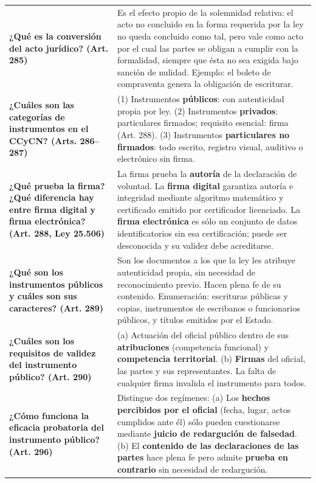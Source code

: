 \documentclass[12pt,oneside]{book}
\begin{document}
\begin{table}[H]
\begin{tabularx}{\textwidth}{
    >{\raggedright\arraybackslash}p{}
    >{\raggedright\arraybackslash}X
}
\textbf{¿Qué es la conversión del acto jurídico? (Art. 285)} &
Es el efecto propio de la solemnidad relativa: el acto no concluido en la forma requerida por la ley no queda concluido como tal, pero vale como acto por el cual las partes se obligan a cumplir con la formalidad, siempre que ésta no sea exigida bajo sanción de nulidad. Ejemplo: el boleto de compraventa genera la obligación de escriturar. \\[6pt]

\textbf{¿Cuáles son las categorías de instrumentos en el CCyCN? (Arts. 286--287)} &
(1) Instrumentos \textbf{públicos}: con autenticidad propia por ley. (2) Instrumentos \textbf{privados}: particulares firmados; requisito esencial: firma (Art. 288). (3) Instrumentos \textbf{particulares no firmados}: todo escrito, registro visual, auditivo o electrónico sin firma. \\[6pt]

\textbf{¿Qué prueba la firma? ¿Qué diferencia hay entre firma digital y firma electrónica? (Art. 288, Ley 25.506)} &
La firma prueba la \textbf{autoría} de la declaración de voluntad. La \textbf{firma digital} garantiza autoría e integridad mediante algoritmo matemático y certificado emitido por certificador licenciado. La \textbf{firma electrónica} es sólo un conjunto de datos identificatorios sin esa certificación; puede ser desconocida y su validez debe acreditarse. \\[6pt]

\textbf{¿Qué son los instrumentos públicos y cuáles son sus caracteres? (Art. 289)} &
Son los documentos a los que la ley les atribuye autenticidad propia, sin necesidad de reconocimiento previo. Hacen plena fe de su contenido. Enumeración: escrituras públicas y copias, instrumentos de escribanos o funcionarios públicos, y títulos emitidos por el Estado. \\[6pt]

\textbf{¿Cuáles son los requisitos de validez del instrumento público? (Art. 290)} &
(a) Actuación del oficial público dentro de sus \textbf{atribuciones} (competencia funcional) y \textbf{competencia territorial}. (b) \textbf{Firmas} del oficial, las partes y sus representantes. La falta de cualquier firma invalida el instrumento para todos. \\[6pt]

\textbf{¿Cómo funciona la eficacia probatoria del instrumento público? (Art. 296)} &
Distingue dos regímenes: (a) Los \textbf{hechos percibidos por el oficial} (fecha, lugar, actos cumplidos ante él) sólo pueden cuestionarse mediante \textbf{juicio de redargución de falsedad}. (b) El \textbf{contenido de las declaraciones de las partes} hace plena fe pero admite \textbf{prueba en contrario} sin necesidad de redargución. \\[6pt]


\end{tabularx}
\end{table}
\end{document}
